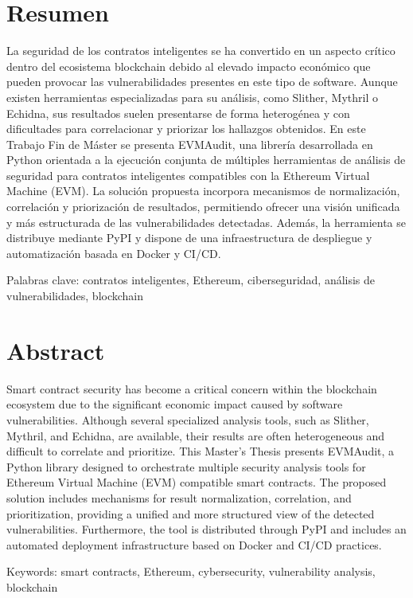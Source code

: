 \section{Resumen}\label{resumen}

La seguridad de los contratos inteligentes se ha convertido en un
aspecto crítico dentro del ecosistema blockchain debido al elevado
impacto económico que pueden provocar las vulnerabilidades presentes en
este tipo de software. Aunque existen herramientas especializadas para
su análisis, como Slither, Mythril o Echidna, sus resultados suelen
presentarse de forma heterogénea y con dificultades para correlacionar y
priorizar los hallazgos obtenidos. En este Trabajo Fin de Máster se
presenta EVMAudit, una librería desarrollada en Python orientada a la
ejecución conjunta de múltiples herramientas de análisis de seguridad
para contratos inteligentes compatibles con la Ethereum Virtual Machine
(EVM). La solución propuesta incorpora mecanismos de normalización,
correlación y priorización de resultados, permitiendo ofrecer una visión
unificada y más estructurada de las vulnerabilidades detectadas. Además,
la herramienta se distribuye mediante PyPI y dispone de una
infraestructura de despliegue y automatización basada en Docker y CI/CD.

Palabras clave: contratos inteligentes, Ethereum, ciberseguridad,
análisis de vulnerabilidades, blockchain

\section{Abstract}\label{abstract}

Smart contract security has become a critical concern within the
blockchain ecosystem due to the significant economic impact caused by
software vulnerabilities. Although several specialized analysis tools,
such as Slither, Mythril, and Echidna, are available, their results are
often heterogeneous and difficult to correlate and prioritize. This
Master's Thesis presents EVMAudit, a Python library designed to
orchestrate multiple security analysis tools for Ethereum Virtual
Machine (EVM) compatible smart contracts. The proposed solution includes
mechanisms for result normalization, correlation, and prioritization,
providing a unified and more structured view of the detected
vulnerabilities. Furthermore, the tool is distributed through PyPI and
includes an automated deployment infrastructure based on Docker and
CI/CD practices.

Keywords: smart contracts, Ethereum, cybersecurity, vulnerability
analysis, blockchain
